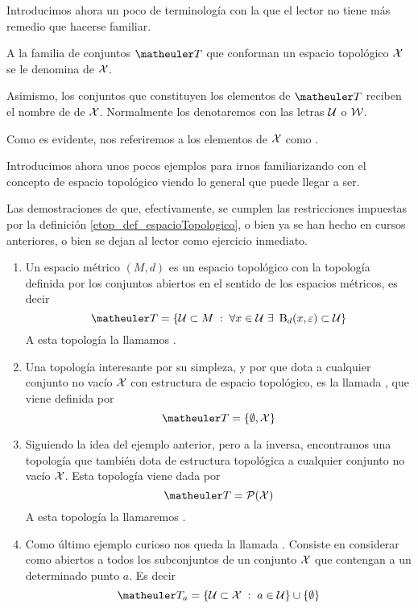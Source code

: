 Introducimos ahora un poco de terminología con la que el lector no tiene más remedio que hacerse familiar.
\begin{obs}[Terminología]
	\label{etop_obs_terminologia}
	A la familia de conjuntos $\T$ que conforman un espacio topológico $\mathcal{X}$ se le denomina  de $\mathcal{X}$.
	
	Asimismo, los conjuntos que constituyen los elementos de $\T$ reciben el nombre de  de $\mathcal{X}$. Normalmente los denotaremos con las letras $\mathcal{U}$ o $\mathcal{W}$.
	
	Como es evidente, nos referiremos a los elementos de $\mathcal{X}$ como .
\end{obs}
Introducimos ahora unos pocos ejemplos para irnos familiarizando con el concepto de espacio topológico viendo lo general que puede llegar a ser.
\begin{exa}[Topologías]
	\label{etop_exa_topologias}
	Las demostraciones de que, efectivamente, se cumplen las restricciones impuestas por la definición \ref{etop_def_espacioTopologico}, o bien ya se han hecho en cursos anteriores, o bien se dejan al lector como ejercicio inmediato.
	\begin{enumerate}
		\item Un espacio métrico $(M,d)$ es un espacio topológico con la topología definida por los conjuntos abiertos en el sentido de los espacios métricos, es decir
		\begin{equation}
		\label{etop_eq_topologiaRn}
		\T = \{\U\subset M\midc \forall x\in\U\ \exists\  \bola_{d}(x,\varepsilon)\subset\U\}
		\end{equation}
		A esta topología la llamamos .
		\item Una topología interesante por su simpleza, y por que dota a cualquier conjunto no vacío $\mathcal{X}$ con estructura de espacio topológico, es la llamada , que viene definida por \begin{equation}
		\label{etop_eq_topologiaTrivial}
		\T=\{\emptyset, \X\}
		\end{equation}
		\item Siguiendo la idea del ejemplo anterior, pero a la inversa, encontramos una topología que también dota de estructura topológica a cualquier conjunto no vacío $\mathcal{X}$. Esta topología viene dada por
		\begin{equation}
		\label{etop_eq_topologiaDiscreta}
		\T = \partes(\X)
		\end{equation}
		A esta topología la llamaremos .
		\item Como último ejemplo curioso nos queda la llamada . Consiste en considerar como abiertos a todos los subconjuntos de un conjunto $\mathcal{X}$ que contengan a un determinado punto $a$. Es decir
		\begin{equation}
		\label{etop_eq_topologiaPunto}
		\T_a = \{\U \subset \X\midc a\in\U\}\cup\{\emptyset\}
		\end{equation}
		

\end{enumerate}
\end{exa}
